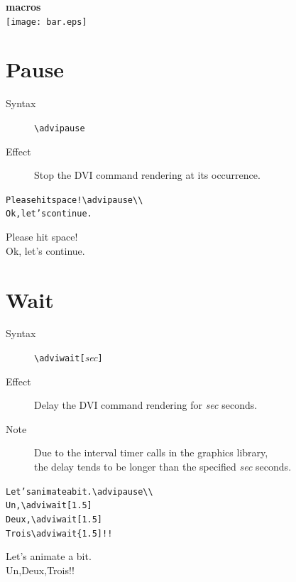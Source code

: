 \documentclass[10pt]{article}
\begin{document}
\noindent
{\bf\Large {\ActiveDVI} macros}\\

\noindent
\texttt{[image: bar.eps]}

\section{Pause}

\begin{description}
\item[Syntax] \verb"\advipause"
\item[Effect] Stop the DVI command rendering at its occurrence.
\end{description}

\begin{minipage}[t]{0.5\textwidth}
\begin{alltt}
Please hit space!{\color{blue}\verb"\"advipause}\verb"\\"
Ok, let's continue.
\end{alltt}
\end{minipage}
\begin{minipage}[t]{0.5\textwidth}
Please hit space!\\ \advipause Ok, let's continue.
\end{minipage}

\section{Wait}

\begin{description}
\item[Syntax] \verb"\adviwait["{\em{sec}}\verb"]"
\item[Effect] Delay the DVI command rendering for {\em{sec}} seconds.
\item[Note] Due to the interval timer calls in the graphics library,\\
  the delay tends to be longer than the specified {\em{sec}} seconds.
\end{description}

\begin{minipage}[t]{0.5\textwidth}
\begin{alltt}
Let's animate a bit.\verb"\advipause\\"
Un,{\color{blue}\verb"\adviwait[1.5]"}
Deux,{\color{blue}\verb"\adviwait[1.5]"}
Trois{\color{blue}\verb"\adviwait{1.5]"}!! 
\end{alltt}
\end{minipage}
\begin{minipage}[t]{0.5\textwidth}
Let's animate a bit.\advipause\\
Un,\adviwait[1.5]
Deux,\adviwait[1.5]
Trois\adviwait[1.5]!! 
\end{minipage}
\end{document}
